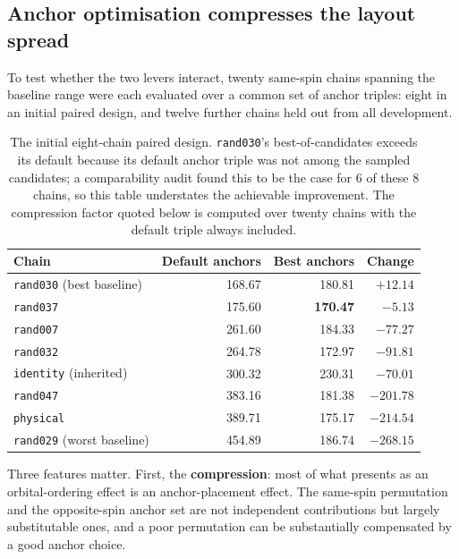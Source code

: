 \documentclass[11pt,a4paper]{article}
\begin{document}
\FloatBarrier
\subsection{Anchor optimisation compresses the layout spread}
\label{sec:compression}

To test whether the two levers interact, twenty same-spin chains spanning the
baseline range were each evaluated over a common set of anchor triples: eight
in an initial paired design, and twelve further chains held out from all
development.

\begin{table}[htbp]\centering\small
\begin{tabular}{lrrr}
\toprule
Chain & Default anchors & Best anchors & Change\\
\midrule
\texttt{rand030} (best baseline)  & 168.67 & 180.81 & $+12.14$\\
\texttt{rand037}                  & 175.60 & \textbf{170.47} & $-5.13$\\
\texttt{rand007}                  & 261.60 & 184.33 & $-77.27$\\
\texttt{rand032}                  & 264.78 & 172.97 & $-91.81$\\
\texttt{identity} (inherited)     & 300.32 & 230.31 & $-70.01$\\
\texttt{rand047}                  & 383.16 & 181.38 & $-201.78$\\
\texttt{physical}                 & 389.71 & 175.17 & $-214.54$\\
\texttt{rand029} (worst baseline) & 454.89 & 186.74 & $-268.15$\\
\bottomrule
\end{tabular}
\caption{The initial eight-chain paired design. \texttt{rand030}'s
best-of-candidates exceeds its default because its default anchor triple was
not among the sampled candidates; a comparability audit found this to be the
case for 6 of these 8 chains, so this table understates the achievable
improvement. The compression factor quoted below is computed over twenty
chains with the default triple always included.}
\end{table}

Three features matter. First, the \textbf{compression}: most of what presents
as an orbital-ordering effect is an anchor-placement effect. The same-spin
permutation and the opposite-spin anchor set are not independent
contributions but largely substitutable ones, and a poor permutation can be
substantially compensated by a good anchor choice.
\end{document}
